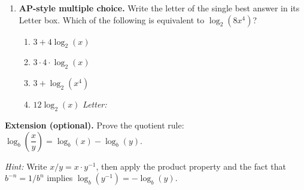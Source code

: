 \documentclass[10pt]{article}
\begin{document}
\begin{enumerate}[leftmargin=1.8em, itemsep=14pt]
\item \textbf{AP-style multiple choice.} Write the letter of the single best answer in its Letter box. Which of the following is equivalent to $\log_2(8x^4)$?

\vspace{6pt}
\begin{enumerate}[leftmargin=2em, itemsep=4pt, label=(\Alph*)]
  \item $3 + 4\log_2(x)$
  \item $3 \cdot 4 \cdot \log_2(x)$
  \item $3 + \log_2(x^4)$
  \item $12\log_2(x)$ \hfill\textit{Letter:}~\gradedblank[id=hw6, type=choice, points=1, answer=A]{0.42in}{13pt}
\end{enumerate}

\end{enumerate}

\vspace{0.12in}

\begin{practicebox}
\textbf{Extension (optional).} Prove the quotient rule:
$\log_b\!\left(\dfrac{x}{y}\right) = \log_b(x) - \log_b(y)$.

\textit{Hint:} Write $x/y = x \cdot y^{-1}$, then apply the product property and the fact
that $b^{-n} = 1/b^n$ implies $\log_b(y^{-1}) = -\log_b(y)$.

\end{practicebox}
\end{document}
